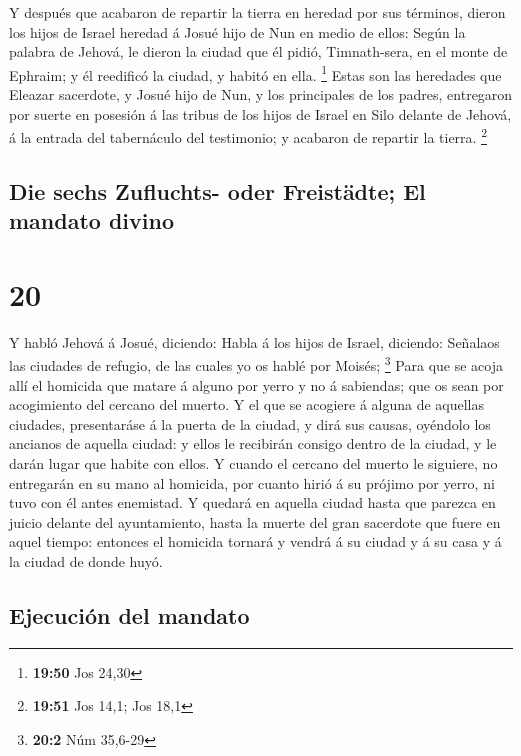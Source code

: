  Y después que acabaron de repartir la tierra en heredad
por sus términos, dieron los hijos de Israel heredad á Josué hijo de Nun
en medio de ellos:  Según la palabra de Jehová, le dieron
la ciudad que él pidió, Timnath-sera, en el monte de Ephraim; y él
reedificó la ciudad, y habitó en ella. \footnote{\textbf{19:50} Jos
  24,30}  Estas son las heredades que Eleazar sacerdote,
y Josué hijo de Nun, y los principales de los padres, entregaron por
suerte en posesión á las tribus de los hijos de Israel en Silo delante
de Jehová, á la entrada del tabernáculo del testimonio; y acabaron de
repartir la tierra. \footnote{\textbf{19:51} Jos 14,1; Jos 18,1}

\hypertarget{die-sechs-zufluchts--oder-freistuxe4dte-el-mandato-divino}{%
\subsection{Die sechs Zufluchts- oder Freistädte; El mandato
divino}\label{die-sechs-zufluchts--oder-freistuxe4dte-el-mandato-divino}}

\hypertarget{section-19}{%
\section{20}\label{section-19}}

 Y habló Jehová á Josué, diciendo:  Habla á
los hijos de Israel, diciendo: Señalaos las ciudades de refugio, de las
cuales yo os hablé por Moisés; \footnote{\textbf{20:2} Núm 35,6-29}
 Para que se acoja allí el homicida que matare á alguno
por yerro y no á sabiendas; que os sean por acogimiento del cercano del
muerto.  Y el que se acogiere á alguna de aquellas
ciudades, presentaráse á la puerta de la ciudad, y dirá sus causas,
oyéndolo los ancianos de aquella ciudad: y ellos le recibirán consigo
dentro de la ciudad, y le darán lugar que habite con ellos.
 Y cuando el cercano del muerto le siguiere, no entregarán
en su mano al homicida, por cuanto hirió á su prójimo por yerro, ni tuvo
con él antes enemistad.  Y quedará en aquella ciudad hasta
que parezca en juicio delante del ayuntamiento, hasta la muerte del gran
sacerdote que fuere en aquel tiempo: entonces el homicida tornará y
vendrá á su ciudad y á su casa y á la ciudad de donde huyó.

\hypertarget{ejecuciuxf3n-del-mandato}{%
\subsection{Ejecución del mandato}\label{ejecuciuxf3n-del-mandato}}

